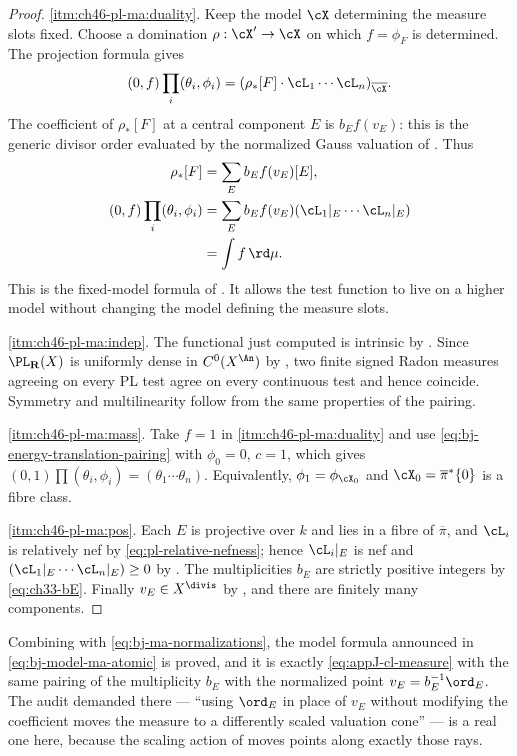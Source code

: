 \begin{proof}
\cref{itm:ch46-pl-ma:duality}.
Keep the model $\cX$ determining the measure slots fixed. Choose a
domination $\rho:\cX'\to\cX$ on which $f=\phi_F$ is determined.
The projection formula gives
\[
 (0,f)\prod_i(\theta_i,\phi_i)
  =(\rho_*[F]\cdot\cL_1\cdots\cL_n)_{\overline\cX}.
\]
The coefficient of $\rho_*[F]$ at a central component $E$ is
$b_Ef(v_E)$: this is the generic divisor order evaluated by the normalized
Gauss valuation of .
Thus
\[
 \begin{aligned}
 \rho_*[F]&=\sum_Eb_Ef(v_E)[E],\\
 (0,f)\prod_i(\theta_i,\phi_i)
   &=\sum_Eb_Ef(v_E)(\cL_1|_E\cdots\cL_n|_E)\\
   &=\int f\,\rd\mu.
 \end{aligned}
\]
This is the fixed-model formula of \cite[Proposition~3.14(vi)]{BJ22}.
It allows the test function to live on a higher model without changing
the model defining the measure slots.

\cref{itm:ch46-pl-ma:indep}.
The functional just computed is intrinsic by
. Since $\PL_{\mathbf R}(X)$ is
uniformly dense in $C^0(X^{\An})$ by , two
finite signed Radon measures agreeing on every PL test agree on every
continuous test and hence coincide. Symmetry and multilinearity follow
from the same properties of the pairing.

\cref{itm:ch46-pl-ma:mass}.  Take $f=1$ in
\cref{itm:ch46-pl-ma:duality} and use
\eqref{eq:bj-energy-translation-pairing} with $\phi_0=0$, $c=1$, which
gives $(0,1)\prod(\theta_i,\phi_i)=(\theta_1\cdots\theta_n)$.
Equivalently, $\phi_1=\phi_{\cX_0}$ and $\cX_0=\overline\pi^*\{0\}$ is
a fibre class.

\cref{itm:ch46-pl-ma:pos}.  Each $E$ is projective over $k$ and lies in
a fibre of $\overline\pi$, and $\cL_i$ is relatively nef by
\eqref{eq:pl-relative-nefness}; hence $\cL_i|_E$ is nef and
$(\cL_1|_E\cdots\cL_n|_E)\ge0$ by .  The
multiplicities $b_E$ are strictly positive integers by
\eqref{eq:ch33-bE}.  Finally $v_E\in X^{\divis}$ by
, and there are finitely many components.
\end{proof}

Combining  with
\eqref{eq:bj-ma-normalizations}, the model formula announced in
\eqref{eq:bj-model-ma-atomic} is proved, and it is exactly
\eqref{eq:appJ-cl-measure} with the same pairing of the multiplicity
$b_E$ with the normalized point $v_E=b_E^{-1}\ord_E$.  The audit
demanded there --- ``using $\ord_E$ in place of $v_E$ without modifying
the coefficient moves the measure to a differently scaled valuation cone''
--- is a real one here, because the scaling action of
 moves points along exactly those rays.

